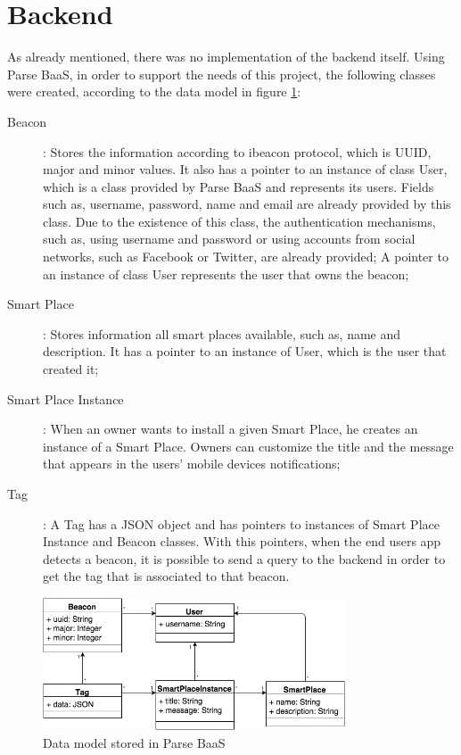 \section{Backend}
\label{sec:implementation_backend}
As already mentioned, there was no implementation of the backend itself.
Using Parse \gls{BaaS}, in order to support the needs of this project, the following classes were
created, according to the data model in figure \ref{fig:backend_data_model}:
\begin{description}
  \item[Beacon]: Stores the information according to ibeacon protocol,
  which is \gls{UUID}, major and minor values. It also has a pointer
  to an instance of class User, which is a class provided by Parse \gls{BaaS} and represents its users. Fields such as, username, password, name and email are already provided by this class.
  Due to the existence of this class, the authentication mechanisms, such as, using username and password or using accounts from social networks, such as Facebook or Twitter, are already provided;
  A pointer to an instance of class User represents the user that owns the beacon;
  \item[Smart Place]: Stores information all smart places available,
  such as, name and description. It has a pointer to an instance of
  User, which is the user that created it;
  \item[Smart Place Instance]: When an owner wants to install a given
  Smart Place, he creates an instance of a Smart Place. Owners can
  customize the title and the message that appears in the users'
  mobile devices notifications;
  \item[Tag]: A Tag has a \gls{JSON} object and has pointers to instances
  of Smart Place Instance and Beacon classes. With this pointers, when
  the end users app detects a beacon, it is possible to send a query to
  the backend in order to get the tag that is associated to that beacon.
\end{description}

\begin{figure}[!ht]
  \centering
    \includegraphics[width=0.8\textwidth]{images/backend_data_model}
    \caption[Data model]{Data model stored in Parse \gls{BaaS}}
    \label{fig:backend_data_model}
\end{figure}

